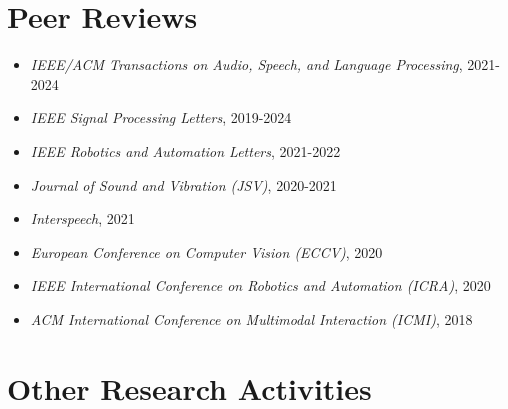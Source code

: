 \documentclass[a4paper,9pt]{extarticle} %
\begin{document}
\begin{enumerate}[label={[\arabic*]}]

\end{enumerate}


\section{Peer Reviews}

\begin{itemize}[itemsep=-.9em]
  \item \textit{IEEE/ACM Transactions on Audio, Speech, and Language Processing}, 2021-2024
  \item \textit{IEEE Signal Processing Letters}, 2019-2024
  \item \textit{IEEE Robotics and Automation Letters}, 2021-2022
  \item \textit{Journal of Sound and Vibration (JSV)}, 2020-2021
  \item \textit{Interspeech}, 2021
  \item \textit{European Conference on Computer Vision (ECCV)}, 2020
  \item \textit{IEEE International Conference on Robotics and Automation (ICRA)}, 2020
  \item \textit{ACM International Conference on Multimodal Interaction (ICMI)}, 2018
\end{itemize}


\section{Other Research Activities}
\end{document}
